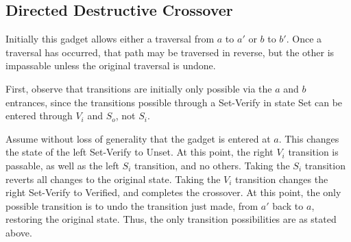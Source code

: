 \documentclass[11pt]{article}
\begin{document}
\subsection{Directed Destructive Crossover}
Initially this gadget allows either a traversal from $a$ to $a'$ or $b$ to $b'$. Once a traversal has occurred, that path may be traversed in reverse, but the other is impassable unless the original traversal is undone.

First, observe that transitions are initially only possible via the $a$ and $b$ entrances, since the transitions possible through a Set-Verify in state Set can be entered through $V_i$ and $S_o$, not $S_i$.

Assume without loss of generality that the gadget is entered at $a$. This changes the state of the left Set-Verify to Unset. At this point, the right $V_i$ transition is passable, as well as the left $S_i$ transition, and no others. Taking the $S_i$ transition reverts all changes to the original state. Taking the $V_i$ transition changes the right Set-Verify to Verified, and completes the crossover. At this point, the only possible transition is to undo the transition just made, from $a'$ back to $a$, restoring the original state. Thus, the only transition possibilities are as stated above.
\end{document}
